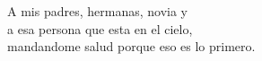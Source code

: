 
\thispagestyle{empty}
\vspace*{17mm}

\begin{flushright}
\begin{itshape}

A mis padres, hermanas, novia y \\
a esa persona que esta en el cielo, \\
mandandome salud porque eso es lo primero.\bigskip\bigskip



\end{itshape}
\end{flushright}

